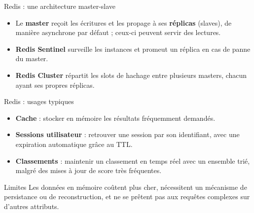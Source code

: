 \begin{frame}{Redis : une architecture master-slave}
    \begin{itemize}
        \item Le \textbf{master} reçoit les écritures et les propage à ses
              \textbf{réplicas} (slaves), de manière asynchrone par défaut ;
              ceux-ci peuvent servir des lectures.
        \item \textbf{Redis Sentinel} surveille les instances et promeut un
              réplica en cas de panne du master.
        \item \textbf{Redis Cluster} répartit les slots de hachage entre
              plusieurs masters, chacun ayant ses propres réplicas.
    \end{itemize}

\end{frame}

\begin{frame}{Redis : usages typiques}
    \begin{itemize}
        \item \textbf{Cache} : stocker en mémoire les résultats fréquemment
              demandés.
        \item \textbf{Sessions utilisateur} : retrouver une session par son
              identifiant, avec une expiration automatique grâce au TTL.
        \item \textbf{Classements} : maintenir un classement en temps réel avec
              un ensemble trié, malgré des mises à jour de score très
              fréquentes.
    \end{itemize}

    \begin{examplebox}{Limites}
        Les données en mémoire coûtent plus cher, nécessitent un mécanisme de
        persistance ou de reconstruction, et ne se prêtent pas aux requêtes
        complexes sur d'autres attributs.
    \end{examplebox}
\end{frame}

